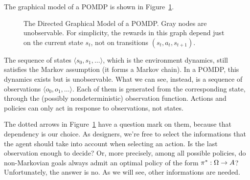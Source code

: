 The graphical model of a POMDP is shown in Figure~\ref{fig:pomdp}.
\begin{figure}

	\centering
	\caption{The Directed Graphical Model of a POMDP. Gray nodes are
	unobservable. For simplicity, the rewards in this graph depend just on the
	current state $s_t$, not on transitions ${(s_t, a_t, s_{t+1})}$.}
	\label{fig:pomdp}
\end{figure}
The sequence of states ${\langle s_0, s_1, \dots \rangle}$, which is the
environment dynamics, still satisfies the Markov assumption (it forms a Markov
chain). In a POMDP, this dynamics exists but is unobservable. What we can
see, instead, is a sequence of observations ${ \langle o_0, o_1, \dots
\rangle}$. Each of them is generated from the corresponding state, through the
(possibly nondeterministic) observation function. Actions and policies can
only act in response to observations, not states.

The dotted arrows in Figure~\ref{fig:pomdp} have a question mark on them,
because that dependency is our choice. As designers, we're free to select
the informations that the agent should take into account when selecting an
action. Is the last observation enough to decide? Or, more precisely, among
all possible policies, do non-Markovian goals always admit an optimal policy
of the form $\pi^*: \Omega \to A$? Unfortunately, the answer is no. As we
will see, other informations are needed.

